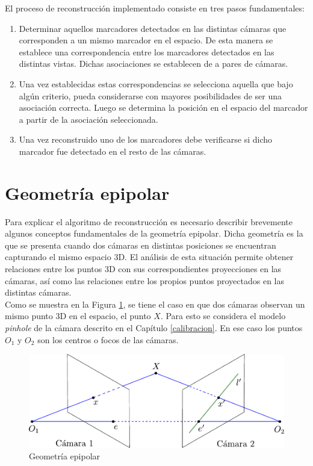 El proceso de reconstrucción implementado consiste en tres pasos fundamentales:
\begin{enumerate}
\item Determinar aquellos marcadores detectados en las distintas cámaras que corresponden a un mismo marcador en el espacio. De esta manera se establece una correspondencia entre los marcadores detectados en las distintas vistas. Dichas asociaciones se establecen de a pares de cámaras.
\item Una vez establecidas estas correspondencias se selecciona aquella que bajo algún criterio, pueda considerarse con mayores posibilidades de ser una asociación correcta. Luego se determina la posición en el espacio del marcador a partir de la asociación seleccionada.
\item Una vez reconstruido uno de los marcadores debe verificarse si dicho marcador fue detectado en el resto de las cámaras.
\end{enumerate}


\section{Geometría epipolar}



Para explicar el algoritmo de reconstrucción es necesario describir brevemente algunos conceptos fundamentales de la geometría epipolar.  Dicha geometría es la que se presenta cuando dos cámaras en distintas posiciones se encuentran capturando el mismo espacio 3D. El análisis de esta situación permite obtener relaciones entre los puntos 3D con sus correspondientes proyecciones en las cámaras, así como las relaciones entre los propios puntos proyectados en las distintas cámaras\cite{cyganek}\cite{hartley}. \\


 Como se muestra en la Figura \ref{fig: geometria_epipolar}, se tiene el caso en que dos cámaras observan un mismo punto 3D en el espacio, el punto $X$. Para esto se considera el modelo \textit{pinhole} de la cámara  descrito en el Capítulo \ref{calibracion}. En ese caso los puntos $O_1$ y $O_2$ son los centros o focos de las cámaras.\\
 
 \begin{figure}[ht!]
 \begin{center}
 \includegraphics[scale=0.7]{img/Reconstruccion/geometria_epipolar}
 \end{center}
 \caption{Geometría epipolar}
 \label{fig: geometria_epipolar}
 \end{figure}
 
